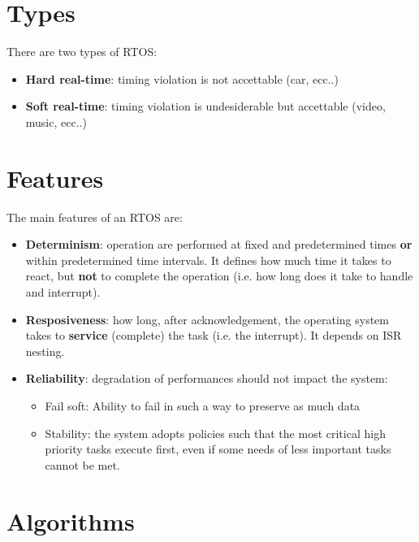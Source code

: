\section{Types}
There are two types of RTOS:
\begin{itemize}
	\item \textbf{Hard real-time}: timing violation is not accettable (car, ecc..)
	\item \textbf{Soft real-time}: timing violation is undesiderable but accettable (video, music, ecc..)
\end{itemize}

\section{Features}
The main features of an RTOS are:
\begin{itemize}
	\item \textbf{Determinism}: operation are performed at fixed and predetermined times \textbf{or} within predetermined time intervals. It defines how much time it takes to react, but \textbf{not} to complete the operation (i.e. how long does it take to handle and interrupt).
	\item \textbf{Resposiveness}: how long, after acknowledgement, the operating system takes to \textbf{service} (complete) the task (i.e. the interrupt). It depends on ISR nesting.
	\item \textbf{Reliability}: degradation of performances should not impact the system:	
	\begin{itemize}
		\item Fail soft: Ability to fail in such a way to preserve as much data
		\item Stability: the system adopts policies such that the most critical high priority tasks execute first, even if some needs of less important tasks cannot be met.
	\end{itemize}
\end{itemize}




\section{Algorithms}
%	
%	
	
